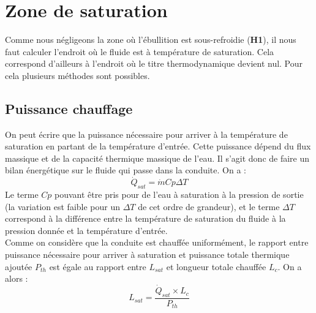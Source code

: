 \section{Zone de saturation\label{section:sat}}
Comme nous négligeons la zone où l'ébullition est sous-refroidie (\textbf{H1}), il nous faut calculer l'endroit où le fluide est à température de saturation. Cela correspond d'ailleurs à l'endroit où le titre thermodynamique devient nul. Pour cela plusieurs méthodes sont possibles.


\subsection{Puissance chauffage}
On peut écrire que la puissance nécessaire pour arriver à la température de saturation en partant de la température d'entrée. Cette puissance dépend du flux massique et de la capacité thermique massique de l'eau. Il s'agit donc de faire un bilan énergétique sur le fluide qui passe dans la conduite. On a :
\begin{equation}
    \dot{Q}_{sat} = \dot{m} Cp \Delta T
\end{equation}
Le terme $Cp$ pouvant être pris pour de l'eau à saturation à la pression de sortie (la variation est faible pour un $\Delta T$ de cet ordre de grandeur), et le terme $\Delta T$ correspond à la différence entre la température de saturation du fluide à la pression donnée et la température d'entrée.\\ 
Comme on considère que la conduite est chauffée uniformément, le rapport entre puissance nécessaire pour arriver à saturation et puissance totale thermique ajoutée $P_{th}$ est égale au rapport entre $L_{sat}$ et longueur totale chauffée $L_c$. On a alors :
\begin{equation}
    L_{sat}= \frac{ \dot{Q}_{sat}\times L_c}{P_{th}}
\end{equation}

